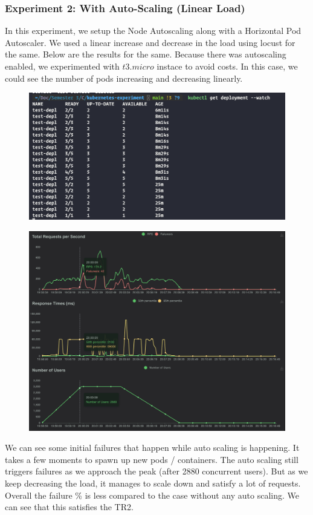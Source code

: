 \documentclass{article}
\begin{document}
\subsubsection{Experiment 2: With Auto-Scaling (Linear Load)}
In this experiment, we setup the Node Autoscaling along with a Horizontal Pod Autoscaler. We used a linear increase and decrease in the load using locust for the same. Below are the results for the same. Because there was autoscaling enabled, we experimented with $t3.micro$ instace to avoid costs. In this case, we could see the number of pods increasing and decreasing linearly. 
\begin{figure}[H]
    \centering
    \includegraphics[width=0.7\linewidth]{images/exp2_watch.png}
\end{figure}
\begin{figure}[H]
    \centering
    \includegraphics[width=0.9\linewidth]{images/exp2_results.png}
\end{figure}
We can see some initial failures that happen while auto scaling is happening. It takes a few moments to spawn up new pods / containers. The auto scaling still triggers failures as we approach the peak (after 2880 concurrent users). But as we keep decreasing the load, it manages to scale down and satisfy a lot of requests. Overall the failure \% is less compared to the case without any auto scaling. We can see that this satisfies the TR2. 
\end{document}
